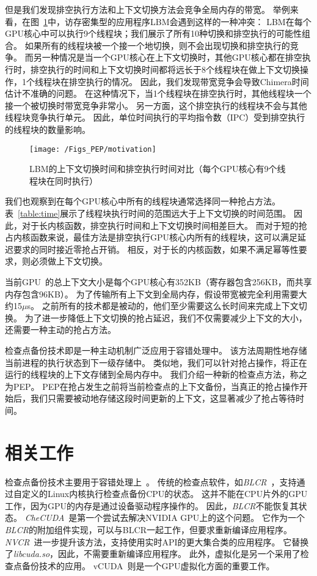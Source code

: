 但是我们发现排空执行方法和上下文切换方法会竞争全局内存的带宽。
举例来看，在图~\ref{fig:motivation}中，访存密集型的应用程序LBM会遇到这样的一种冲突：
LBM在每个GPU核心中可以执行9个线程块；我们展示了所有10种切换和排空执行的可能性组合。
如果所有的线程块被一个接一个地切换，则不会出现切换和排空执行的竞争。
而另一种情况是当一个GPU核心在上下文切换时，其他GPU核心都在排空执行时，排空执行的时间和上下文切换时间都将远长于8个线程块在做上下文切换操作，1个线程块在排空执行的情况。
因此，我们发现带宽竞争会导致Chimera时间估计不准确的问题。
在这种情况下，当1个线程块在排空执行时，其他线程块一个接一个被切换时带宽竞争非常小。
另一方面，这个排空执行的线程块不会与其他线程块竞争执行单元。
因此，单位时间执行的平均指令数（IPC）受到排空执行的线程块的数量影响。


\begin{figure}[htbp] %
  \centering
  \texttt{[image: /Figs\_PEP/motivation]}
  \caption{LBM的上下文切换时间和排空执行时间对比（每个GPU核心有9个线程块在同时执行）}
  \label{fig:motivation}
\end{figure}


我们也观察到在每个GPU核心中所有的线程块通常选择同一种抢占方法。
表~\ref{table:time}展示了线程块执行时间的范围远大于上下文切换的时间范围。
因此，对于长内核函数，排空执行时间和上下文切换时间相差巨大。
而对于短的抢占内核函数来说，最佳方法是排空执行GPU核心内所有的线程块，这可以满足延迟要求的同时接近零抢占开销。
相反，对于长的内核函数，如果不满足幂等性要求，则必须做上下文切换。

当前GPU~的总上下文大小是每个GPU核心有352KB（寄存器包含256KB，而共享内存包含96KB）。
为了传输所有上下文到全局内存，假设带宽被完全利用需要大约15$\mu$s。
之前所有的技术都是被动的，他们至少需要这么长时间来完成上下文切换。
为了进一步降低上下文切换的抢占延迟，我们不仅需要减少上下文的大小，还需要一种主动的抢占方法。

检查点备份技术即是一种主动机制广泛应用于容错处理中。
该方法周期性地存储当前进程的执行状态到下一级存储中。
类似地，我们可以针对抢占操作，将正在运行的线程块的上下文存储到全局内存中。
我们介绍一种新的检查点方法，称之为PEP。
PEP在抢占发生之前将当前检查点的上下文备份，当真正的抢占操作开始后，我们只需要被动地存储这段时间更新的上下文，这显著减少了抢占等待时间。

\section{相关工作}
\label{sec:peprelated}

检查点备份技术主要用于容错处理上~。
传统的检查点软件，如\emph{BLCR}~，支持通过自定义的Linux内核执行检查点备份CPU的状态。
这并不能在CPU片外的GPU工作，因为GPU的内存是通过设备驱动程序操作的。
因此，\emph{BLCR}不能恢复其状态。
\emph{CheCUDA}~是第一个尝试去解决NVIDIA GPU上的这个问题。
它作为一个\emph{BLCR}的附加组件实现，可以与BLCR一起工作，但要求重新编译应用程序。
\emph{NVCR}~进一步提升该方法，支持使用实时API的更大集合类的应用程序。
它替换了\emph{libcuda.so}，因此，不需要重新编译应用程序。
此外，虚拟化是另一个采用了检查点备份技术的应用。
vCUDA~则是一个GPU虚拟化方面的重要工作。



